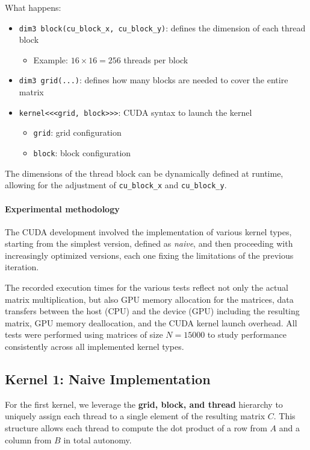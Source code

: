What happens: 
\begin{itemize}
    \item \texttt{dim3 block(cu\_block\_x, cu\_block\_y)}: defines the dimension of each thread block
    \begin{itemize}
        \item Example: $16 \times 16 = 256$ threads per block
    \end{itemize}
    \item \texttt{dim3 grid(...)}: defines how many blocks are needed to cover the entire matrix
    \item \texttt{kernel<<<grid, block>>>}: CUDA syntax to launch the kernel
    \begin{itemize}
        \item \texttt{grid}: grid configuration
        \item \texttt{block}: block configuration
    \end{itemize}
\end{itemize}
The dimensions of the thread block can be dynamically defined at runtime, allowing for the adjustment of \texttt{cu\_block\_x} and \texttt{cu\_block\_y}.

\paragraph{Experimental methodology}
The CUDA development involved the implementation of various kernel types, starting from the simplest version, defined as \emph{naive}, and then proceeding with increasingly optimized versions, each one fixing the limitations of the previous iteration.

The recorded execution times for the various tests reflect not only the actual matrix multiplication, but also GPU memory allocation for the matrices, data transfers between the host (CPU) and the device (GPU) including the resulting matrix, GPU memory deallocation, and the CUDA kernel launch overhead.
All tests were performed using matrices of size $N = 15000$ to study performance consistently across all implemented kernel types.

\subsection{Kernel 1: Naive Implementation}


For the first kernel, we leverage the \textbf{grid, block, and thread} hierarchy to uniquely assign each thread to a single element of the resulting matrix $C$. This structure allows each thread to compute the dot product of a row from $A$ and a column from $B$ in total autonomy.

